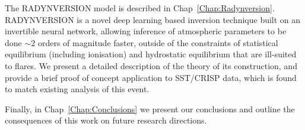 The RADYNVERSION model is described in Chap~\ref{Chap:Radynversion}.
RADYNVERSION is a novel deep learning based inversion technique built on an invertible neural network, allowing inference of atmospheric parameters to be done $\sim2$ orders of magnitude faster, outside of the constraints of statistical equilibrium (including ionisation) and hydrostatic equilibrium that are ill-suited to flares.
We present a detailed description of the theory of its construction, and provide a brief proof of concept application to SST/CRISP data, which is found to match existing analysis of this event.

Finally, in Chap~\ref{Chap:Conclusions} we present our conclusions and outline the consequences of this work on future research directions.




